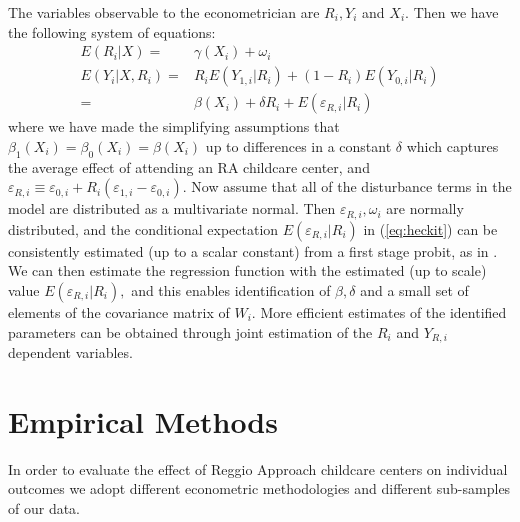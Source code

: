 \documentclass[12pt]{article}
\begin{document}
\bigskip

The variables observable to the econometrician are $R_{i},Y_{i}$ and $X_{i}$. Then we have the following system of equations:%
\begin{align}
E(R_{i}|X)        =&  \gamma \left(X_{i} \right) + \omega_{i}  \label{eq:1stage} \\
E(Y_{i} |X,R_{i})   =& R_{i} E(Y_{1,i}| R_{i}) + (1-R_{i}) E(Y_{0,i}| R_{i}) \nonumber \\
   =& \beta(X_{i}) + \delta R_{i} + E(\varepsilon_{R,i}| R_{i}) \label{eq:heckit}
\end{align}
where we have made the simplifying assumptions that $\beta_{1}(X_{i})=\beta_{0}(X_{i})=\beta(X_{i})$ up to differences in a constant $\delta$ which captures the average effect of attending an RA childcare center, and $\varepsilon_{R,i} \equiv \varepsilon_{0,i} +R_{i} (\varepsilon_{1,i}-\varepsilon_{0,i})$.
Now assume that all of the disturbance terms in the model are distributed as a multivariate normal. Then $\varepsilon_{R,i}, \omega_{i}$ are normally distributed, and the conditional expectation $E(\varepsilon_{R,i}|R_{i})$ in (\ref{eq:heckit}) can be consistently estimated (up to a scalar constant) from a first stage probit, as in \cite{Heckman1979}. We can then estimate the regression function with the estimated (up to scale) value $E(\varepsilon_{R,i}|R_{i}),$ and this enables identification of $\beta,\delta$ and a small set of elements of the covariance matrix of $W_{i}.$ More efficient estimates of the identified parameters can be obtained through joint estimation of the $R_{i}$ and $Y_{R,i}$ dependent variables.

%

\section{Empirical Methods} \label{sec:method}

In order to evaluate the effect of Reggio Approach childcare centers on individual outcomes we adopt different econometric methodologies and different sub-samples of our data.
\end{document}
